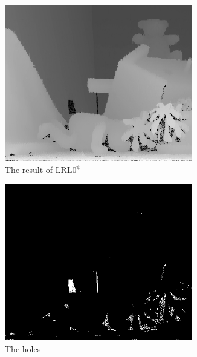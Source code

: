 \documentclass{article}
\begin{document}
\begin{CJK*}{UTF8}{bkai}
\begin{figure}[h]
    \centering
    \begin{subfigure}[h]{0.3\textwidth}
        \centering
        \includegraphics[width=0.9\textwidth]{results/original.png}
        \caption{The result of $\mathrm{LRL0^{\psi}}$}
    \end{subfigure}
    \begin{subfigure}[h]{0.3\textwidth}
        \centering
        \includegraphics[width=0.9\textwidth]{results/holes.png}
        \caption{The holes}
        \label{fig:details_of_our_improvement_hole}
    \end{subfigure}
    \begin{subfigure}[h]{0.3\textwidth}

\end{subfigure}
\end{figure}
\end{CJK*}
\end{document}
